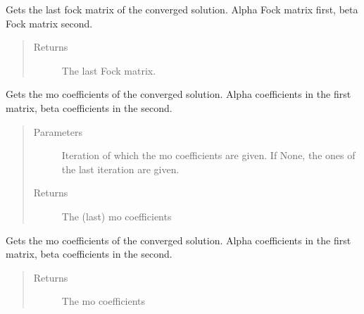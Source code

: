 \documentclass[letterpaper,10pt,english]{sphinxmanual}
\begin{document}
\begin{fulllineitems}

\begin{fulllineitems}
\label{\detokenize{cUHF_b:hf.HartreeFock.cUHF_b.MF.get_last_fock}}
Gets the last fock matrix of the converged solution.
Alpha Fock matrix first, beta Fock matrix second.
\begin{quote}\begin{description}
\item[{Returns}] \leavevmode
The last Fock matrix.

\end{description}\end{quote}

\end{fulllineitems}


\begin{fulllineitems}
\label{\detokenize{cUHF_b:hf.HartreeFock.cUHF_b.MF.get_mo}}
Gets the mo coefficients of the converged solution.
Alpha coefficients in the first matrix, beta coefficients in the second.
\begin{quote}\begin{description}
\item[{Parameters}] \leavevmode
{} \textendash{} Iteration of which the mo coefficients are given. If None, the ones of the last iteration are given.

\item[{Returns}] \leavevmode
The (last) mo coefficients

\end{description}\end{quote}

\end{fulllineitems}


\begin{fulllineitems}
\label{\detokenize{cUHF_b:hf.HartreeFock.cUHF_b.MF.get_mo_coeff}}
Gets the mo coefficients of the converged solution.
Alpha coefficients in the first matrix, beta coefficients in the second.
\begin{quote}\begin{description}
\item[{Returns}] \leavevmode
The mo coefficients


\end{description}
\end{quote}
\end{fulllineitems}
\end{fulllineitems}
\end{document}
